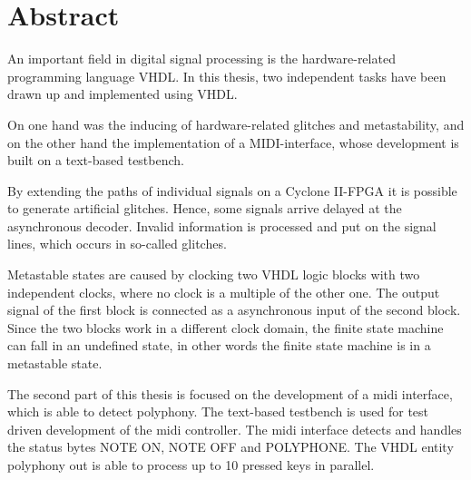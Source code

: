 
\chapter*{Abstract}\label{chap.abstract}

An important field in digital signal processing is the hardware-related programming language VHDL. In this thesis, two independent tasks have been drawn up and implemented using VHDL.

On one hand was the inducing of hardware-related glitches and metastability, and on the other hand the implementation of a MIDI-interface, whose development is built on a text-based testbench.

By extending the paths of individual signals on a Cyclone II-FPGA it is possible to generate artificial glitches. Hence, some signals arrive delayed at the asynchronous decoder. Invalid information is processed and put on the signal lines, which occurs in so-called glitches.

Metastable states are caused by clocking two VHDL logic blocks with two independent clocks, where no clock is a multiple of the other one. The output signal of the first block is connected as a asynchronous input of the second block. Since the two blocks work in a different clock domain, the finite state machine can fall in an undefined state, in other words the finite state machine is in a metastable state.

The second part of this thesis is focused on the development of a midi interface, which is able to detect polyphony. The text-based testbench is used for test driven development of the midi controller. The midi interface detects and handles the status bytes NOTE ON, NOTE OFF and POLYPHONE. The VHDL entity polyphony out is able to process up to 10 pressed keys in parallel.
